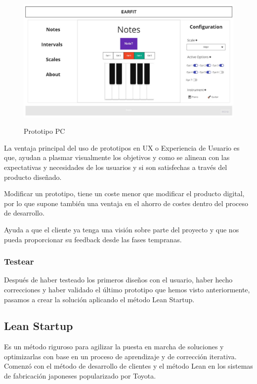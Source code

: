 \documentclass[12pt,twoside,titlepage]{report}
\begin{document}
    \begin{figure}[H]
        \centering
        \includegraphics[scale=0.3]{WireframePC}
        \label{fig:PrototipoPC}
        \caption{Prototipo PC}
    \end{figure}

La ventaja principal del uso de prototipos en UX o Experiencia de Usuario es que, ayudan a plasmar visualmente los objetivos y como se alinean con las expectativas y necesidades de los usuarios y si son satisfechas a través del producto diseñado.

Modificar un prototipo, tiene un coste menor que modificar el producto digital, por lo que supone también una ventaja en el ahorro de costes dentro del proceso de desarrollo.

Ayuda a que el cliente ya tenga una visión sobre parte del proyecto y que nos pueda proporcionar su feedback desde las fases tempranas.

\subsubsection{Testear}

Después de haber testeado los primeros diseños con el usuario, haber hecho correcciones y haber validado el último prototipo que hemos visto anteriormente, pasamos a crear la solución aplicando el método Lean Startup.

\subsection{Lean Startup}

Es un método riguroso para agilizar la puesta en marcha de soluciones y optimizarlas con base en un proceso de aprendizaje y de corrección iterativa. Comenzó con el método de desarrollo de clientes y el método Lean en los sistemas de fabricación japoneses popularizado por Toyota.
\end{document}
